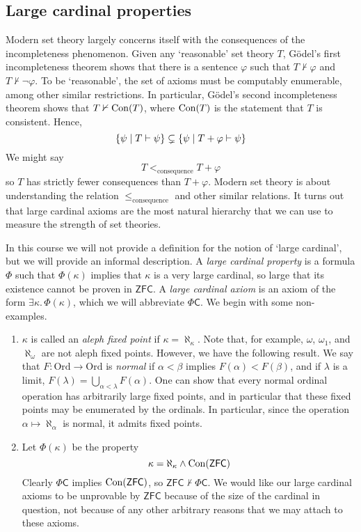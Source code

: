 \subsection{Large cardinal properties}
Modern set theory largely concerns itself with the consequences of the incompleteness phenomenon.
Given any `reasonable' set theory \( T \), G\"odel's first incompleteness theorem shows that there is a sentence \( \varphi \) such that \( T \nvdash \varphi \) and \( T \nvdash \neg\varphi \).
To be `reasonable', the set of axioms must be computably enumerable, among other similar restrictions.
In particular, G\"odel's second incompleteness theorem shows that \( T \nvdash \operatorname{Con}(T) \), where \( \operatorname{Con}(T) \) is the statement that \( T \) is consistent.
Hence,
\[ \qty{\psi \mid T \vdash \psi} \subsetneq \qty{\psi \mid T + \varphi \vdash \psi} \]
We might say
\[ T <_{\text{consequence}} T + \varphi \]
so \( T \) has strictly fewer consequences than \( T + \varphi \).
Modern set theory is about understanding the relation \( \leq_{\text{consequence}} \) and other similar relations.
It turns out that large cardinal axioms are the most natural hierarchy that we can use to measure the strength of set theories.

In this course we will not provide a definition for the notion of `large cardinal', but we will provide an informal description.
A \emph{large cardinal property} is a formula \( \Phi \) such that \( \Phi(\kappa) \) implies that \( \kappa \) is a very large cardinal, so large that its existence cannot be proven in \( \mathsf{ZFC} \).
A \emph{large cardinal axiom} is an axiom of the form \( \exists \kappa.\, \Phi(\kappa) \), which we will abbreviate \( \Phi \mathsf{C} \).
We begin with some non-examples.

\begin{enumerate}
    \item \( \kappa \) is called an \emph{aleph fixed point} if \( \kappa = \aleph_\kappa \).
    Note that, for example, \( \omega \), \( \omega_1 \), and \( \aleph_\omega \) are not aleph fixed points.
    However, we have the following result.
    We say that \( F : \mathrm{Ord} \to \mathrm{Ord} \) is \emph{normal} if \( \alpha < \beta \) implies \( F(\alpha) < F(\beta) \), and if \( \lambda \) is a limit, \( F(\lambda) = \bigcup_{\alpha < \lambda} F(\alpha) \).
    One can show that every normal ordinal operation has arbitrarily large fixed points, and in particular that these fixed points may be enumerated by the ordinals.
    In particular, since the operation \( \alpha \mapsto \aleph_\alpha \) is normal, it admits fixed points.
    \item Let \( \Phi(\kappa) \) be the property
    \[ \kappa = \aleph_\kappa \wedge \operatorname{Con}(\mathsf{ZFC}) \]
    Clearly \( \Phi \mathsf{C} \) implies \( \operatorname{Con}(\mathsf{ZFC}) \), so \( \mathsf{ZFC} \nvdash \Phi \mathsf{C} \).
    We would like our large cardinal axioms to be unprovable by \( \mathsf{ZFC} \) because of the size of the cardinal in question, not because of any other arbitrary reasons that we may attach to these axioms.
\end{enumerate}

